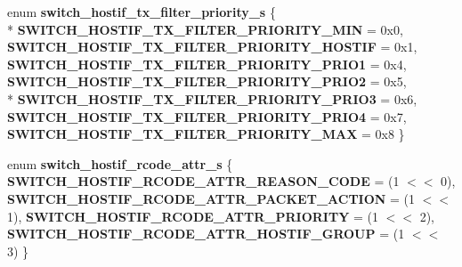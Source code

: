 \begin{DoxyCompactItemize}
\item 
\hypertarget{group__HostInterface_ga867f79583d6548f921fb77949a0f1183}{enum {\bfseries switch\+\_\+hostif\+\_\+tx\+\_\+filter\+\_\+priority\+\_\+s} \{ \\*
{\bfseries S\+W\+I\+T\+C\+H\+\_\+\+H\+O\+S\+T\+I\+F\+\_\+\+T\+X\+\_\+\+F\+I\+L\+T\+E\+R\+\_\+\+P\+R\+I\+O\+R\+I\+T\+Y\+\_\+\+M\+I\+N} = 0x0, 
{\bfseries S\+W\+I\+T\+C\+H\+\_\+\+H\+O\+S\+T\+I\+F\+\_\+\+T\+X\+\_\+\+F\+I\+L\+T\+E\+R\+\_\+\+P\+R\+I\+O\+R\+I\+T\+Y\+\_\+\+H\+O\+S\+T\+I\+F} = 0x1, 
{\bfseries S\+W\+I\+T\+C\+H\+\_\+\+H\+O\+S\+T\+I\+F\+\_\+\+T\+X\+\_\+\+F\+I\+L\+T\+E\+R\+\_\+\+P\+R\+I\+O\+R\+I\+T\+Y\+\_\+\+P\+R\+I\+O1} = 0x4, 
{\bfseries S\+W\+I\+T\+C\+H\+\_\+\+H\+O\+S\+T\+I\+F\+\_\+\+T\+X\+\_\+\+F\+I\+L\+T\+E\+R\+\_\+\+P\+R\+I\+O\+R\+I\+T\+Y\+\_\+\+P\+R\+I\+O2} = 0x5, 
\\*
{\bfseries S\+W\+I\+T\+C\+H\+\_\+\+H\+O\+S\+T\+I\+F\+\_\+\+T\+X\+\_\+\+F\+I\+L\+T\+E\+R\+\_\+\+P\+R\+I\+O\+R\+I\+T\+Y\+\_\+\+P\+R\+I\+O3} = 0x6, 
{\bfseries S\+W\+I\+T\+C\+H\+\_\+\+H\+O\+S\+T\+I\+F\+\_\+\+T\+X\+\_\+\+F\+I\+L\+T\+E\+R\+\_\+\+P\+R\+I\+O\+R\+I\+T\+Y\+\_\+\+P\+R\+I\+O4} = 0x7, 
{\bfseries S\+W\+I\+T\+C\+H\+\_\+\+H\+O\+S\+T\+I\+F\+\_\+\+T\+X\+\_\+\+F\+I\+L\+T\+E\+R\+\_\+\+P\+R\+I\+O\+R\+I\+T\+Y\+\_\+\+M\+A\+X} = 0x8
 \}}\label{group__HostInterface_ga867f79583d6548f921fb77949a0f1183}

\item 
\hypertarget{group__HostInterface_ga6174fbb5d8f36cb7ce80ba9fd5b65792}{enum {\bfseries switch\+\_\+hostif\+\_\+rcode\+\_\+attr\+\_\+s} \{ {\bfseries S\+W\+I\+T\+C\+H\+\_\+\+H\+O\+S\+T\+I\+F\+\_\+\+R\+C\+O\+D\+E\+\_\+\+A\+T\+T\+R\+\_\+\+R\+E\+A\+S\+O\+N\+\_\+\+C\+O\+D\+E} = (1 $<$$<$ 0), 
{\bfseries S\+W\+I\+T\+C\+H\+\_\+\+H\+O\+S\+T\+I\+F\+\_\+\+R\+C\+O\+D\+E\+\_\+\+A\+T\+T\+R\+\_\+\+P\+A\+C\+K\+E\+T\+\_\+\+A\+C\+T\+I\+O\+N} = (1 $<$$<$ 1), 
{\bfseries S\+W\+I\+T\+C\+H\+\_\+\+H\+O\+S\+T\+I\+F\+\_\+\+R\+C\+O\+D\+E\+\_\+\+A\+T\+T\+R\+\_\+\+P\+R\+I\+O\+R\+I\+T\+Y} = (1 $<$$<$ 2), 
{\bfseries S\+W\+I\+T\+C\+H\+\_\+\+H\+O\+S\+T\+I\+F\+\_\+\+R\+C\+O\+D\+E\+\_\+\+A\+T\+T\+R\+\_\+\+H\+O\+S\+T\+I\+F\+\_\+\+G\+R\+O\+U\+P} = (1 $<$$<$ 3)
 \}}\label{group__HostInterface_ga6174fbb5d8f36cb7ce80ba9fd5b65792}

\end{DoxyCompactItemize}
